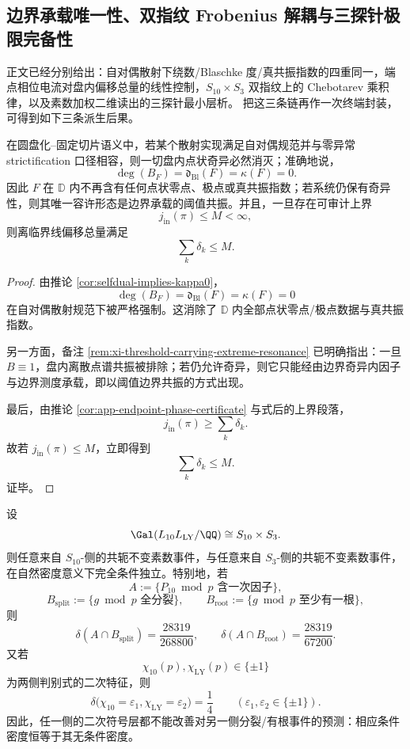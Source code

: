 \subsection{边界承载唯一性、双指纹 Frobenius 解耦与三探针极限完备性}

正文已经分别给出：自对偶散射下绕数/Blaschke 度/真共振指数的四重同一，端点相位电流对盘内偏移总量的线性控制，\(S_{10}\times S_3\) 双指纹上的 Chebotarev 乘积律，以及素数加权二维读出的三探针最小层析。
把这三条链再作一次终端封装，可得到如下三条派生后果。

\begin{theorem}\label{thm:derived-selfdual-strictification-boundary-only-carrying}
在圆盘化--固定切片语义中，若某个散射实现满足自对偶规范并与零异常 strictification 口径相容，则一切盘内点状奇异必然消灭；准确地说，
\[
\deg(B_F)=\mathfrak d_{\mathrm{Bl}}(F)=\kappa(F)=0.
\]
因此 \(F\) 在 \(\mathbb D\) 内不再含有任何点状零点、极点或真共振指数；若系统仍保有奇异性，则其唯一容许形态是边界承载的阈值共振。并且，一旦存在可审计上界
\[
j_{\mathrm{in}}(\pi)\le M<\infty,
\]
则离临界线偏移总量满足
\[
\sum_k\delta_k\le M.
\]
\end{theorem}

\begin{proof}
由推论 \ref{cor:selfdual-implies-kappa0}，
\[
\deg(B_F)=\mathfrak d_{\mathrm{Bl}}(F)=\kappa(F)=0
\]
在自对偶散射规范下被严格强制。这消除了 \(\mathbb D\) 内全部点状零点/极点数据与真共振指数。

另一方面，备注 \ref{rem:xi-threshold-carrying-extreme-resonance} 已明确指出：一旦 \(B\equiv 1\)，盘内离散点谱共振被排除；若仍允许奇异，则它只能经由边界奇异内因子与边界测度承载，即以阈值边界共振的方式出现。

最后，由推论 \ref{cor:app-endpoint-phase-certificate} 与式后的上界段落，
\[
j_{\mathrm{in}}(\pi)\ge \sum_k\delta_k.
\]
故若 \(j_{\mathrm{in}}(\pi)\le M\)，立即得到
\[
\sum_k\delta_k\le M.
\]
证毕。
\end{proof}

\begin{theorem}\label{thm:derived-dualfingerprint-frobenius-conditional-decoupling}
设
\[
\Gal(L_{10}L_{\mathrm{LY}}/\QQ)\cong S_{10}\times S_3.
\]
则任意来自 \(S_{10}\)-侧的共轭不变素数事件，与任意来自 \(S_3\)-侧的共轭不变素数事件，在自然密度意义下完全条件独立。特别地，若
\[
A:=\{\text{\(P_{10}\bmod p\) 含一次因子}\},
\]
\[
B_{\mathrm{split}}:=\{\text{\(g\bmod p\) 全分裂}\},
\qquad
B_{\mathrm{root}}:=\{\text{\(g\bmod p\) 至少有一根}\},
\]
则
\[
\delta(A\cap B_{\mathrm{split}})=\frac{28319}{268800},
\qquad
\delta(A\cap B_{\mathrm{root}})=\frac{28319}{67200}.
\]
又若
\[
\chi_{10}(p),\chi_{\mathrm{LY}}(p)\in\{\pm1\}
\]
为两侧判别式的二次特征，则
\[
\delta\bigl(\chi_{10}=\varepsilon_1,\chi_{\mathrm{LY}}=\varepsilon_2\bigr)=\frac14
\qquad
(\varepsilon_1,\varepsilon_2\in\{\pm1\}).
\]
因此，任一侧的二次符号层都不能改善对另一侧分裂/有根事件的预测：相应条件密度恒等于其无条件密度。
\end{theorem}

